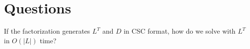 \documentclass{article}
\begin{document}
%
%
%
%
%
%
%
%    


\section{Questions} 
If the factorization generates $L^T$ and $D$ in CSC format, how do we solve with $L^T$ in $O(|L|)$ time?
\end{document}
